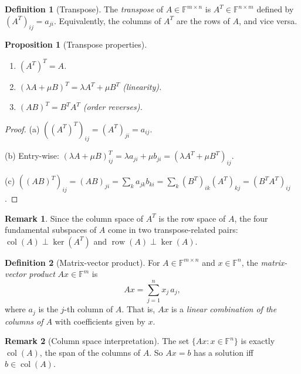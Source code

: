 \documentclass[11pt]{article}
\theoremstyle{definition}
\newtheorem{definition}{Definition}[section]
\newtheorem{remark}{Remark}[section]
\theoremstyle{plain}
\newtheorem{proposition}{Proposition}[section]
\begin{document}
\begin{definition}[Transpose]
  The \emph{transpose} of $A\in\mathbb{F}^{m\times n}$ is
  $A^T\in\mathbb{F}^{n\times m}$ defined by $(A^T)_{ij} = a_{ji}$.
  Equivalently, the columns of $A^T$ are the rows of $A$, and vice versa.
\end{definition}

\begin{proposition}[Transpose properties]
  \leavevmode
  \begin{enumerate}[label=(\alph*)]
    \item $(A^T)^T = A$.
    \item $(\lambda A + \mu B)^T = \lambda A^T + \mu B^T$ (linearity).
    \item $(AB)^T = B^T A^T$ \quad (order reverses).
  \end{enumerate}
\end{proposition}
\begin{proof}
  (a) $((A^T)^T)_{ij} = (A^T)_{ji} = a_{ij}$.

  (b) Entry-wise: $(\lambda A+\mu B)^T_{ij} = \lambda a_{ji}+\mu b_{ji}
  = (\lambda A^T+\mu B^T)_{ij}$.

  (c) $((AB)^T)_{ij} = (AB)_{ji} = \sum_k a_{jk}b_{ki}
  = \sum_k (B^T)_{ik}(A^T)_{kj} = (B^TA^T)_{ij}$.
\end{proof}

\begin{remark}
  Since the column space of $A^T$ is the row space of $A$, the four
  fundamental subspaces of $A$ come in two transpose-related pairs:
  $\operatorname{col}(A)\perp\ker(A^T)$ and
  $\operatorname{row}(A)\perp\ker(A)$.
\end{remark}

\begin{definition}[Matrix-vector product]
  For $A\in\mathbb{F}^{m\times n}$ and $x\in\mathbb{F}^n$, the
  \emph{matrix-vector product} $Ax\in\mathbb{F}^m$ is
  \[
    Ax = \sum_{j=1}^n x_j\, a_j,
  \]
  where $a_j$ is the $j$-th column of $A$.  That is, $Ax$ is a
  \emph{linear combination of the columns of $A$} with coefficients
  given by $x$.
\end{definition}

\begin{remark}[Column space interpretation]
  The set $\{Ax : x\in\mathbb{F}^n\}$ is exactly $\operatorname{col}(A)$,
  the span of the columns of $A$.  So $Ax = b$ has a solution iff
  $b\in\operatorname{col}(A)$.
\end{remark}
\end{document}
